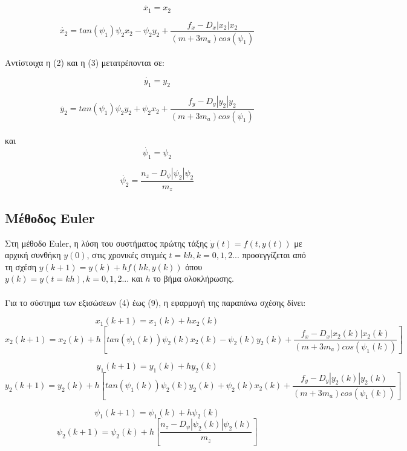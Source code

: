 \documentclass{article}
\begin{document}
\begin{equation}
\dot{x_1} = x_2
\end{equation}

\begin{equation}
\dot{x_2} = tan(\psi_1)\psi_2x_2 - \psi_2y_2 + \frac{f_x - D_x|x_2|x_2}{(m + 3m_a)cos(\psi_1)} 
\end{equation}
\\
Αντίστοιχα η (2) και η (3) μετατρέπονται σε:

\begin{equation}
\dot{y_1} = y_2
\end{equation}

\begin{equation}
\dot{y_2} = tan(\psi_1)\psi_2y_2 + \psi_2x_2 + \frac{f_y - D_y|y_2|y_2}{(m + 3m_a)cos(\psi_1)} 
\end{equation}
\\
και
\\
\begin{equation}
\dot{\psi_1} = \psi_2
\end{equation}

\begin{equation}
\dot{\psi_2} = \frac{n_z - D_\psi|\psi_2|\psi_2}{m_z} 
\end{equation}

\subsection{Μέθοδος Euler}
Στη μέθοδο Euler, η λύση του συστήματος πρώτης τάξης \(\dot{y}(t) = f(t, y(t))\) με αρχική συνθήκη \(y(0)\), στις χρονικές στιγμές \(t = kh, k = 0, 1, 2...\) προσεγγίζεται από τη σχέση \(y(k+1) = y(k) + hf(hk, y(k))\) όπου \(y(k) = y(t = kh), k = 0, 1, 2...\) και \(h\) το βήμα ολοκλήρωσης.
\\\\
Για το σύστημα των εξισώσεων (4) έως (9), η εφαρμογή της παραπάνω σχέσης δίνει:

\[x_1(k+1) = x_1(k) + hx_2(k)\]
\[x_2(k+1) = x_2(k) + h[tan(\psi_1(k))\psi_2(k)x_2(k) - \psi_2(k)y_2(k) + \frac{f_x - D_x|x_2(k)|x_2(k)}{(m + 3m_a)cos(\psi_1(k))}]\]

\[ y_1(k+1)   = y_1(k) + hy_2(k)   \]
\[y_2(k+1) = y_2(k) + h[tan(\psi_1(k))\psi_2(k)y_2(k) + \psi_2(k)x_2(k) + \frac{f_y - D_y|y_2(k)|y_2(k)}{(m + 3m_a)cos(\psi_1(k))}]\]


\[ \psi_1(k+1)   = \psi_1(k) + h\psi_2(k)   \]
\[ \psi_2(k+1) = \psi_2(k) + h[\frac{n_z - D_\psi|\psi_2(k)|\psi_2(k)}{m_z}]\]
\end{document}
